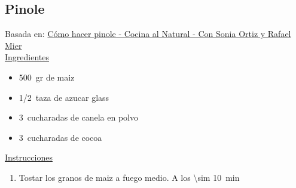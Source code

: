 \subsection{Pinole}

Basada en: \href{https://www.youtube.com/watch?v=ay2mmB5-18g}{Cómo hacer pinole - Cocina al Natural - Con Sonia Ortiz y Rafael Mier} \\

\underline{Ingredientes}

\begin{itemize}
\item \SI{500}{gr} de maiz
\item \SI{1/2}{taza} de azucar glass
\item \SI{3}{cucharadas} de canela en polvo
\item \SI{3}{cucharadas} de cocoa
\end{itemize}


\underline{Instrucciones}

\begin{enumerate}
\item Tostar los granos de maiz a fuego medio. A los \SI{\sim 10}{min}
\end{enumerate}
